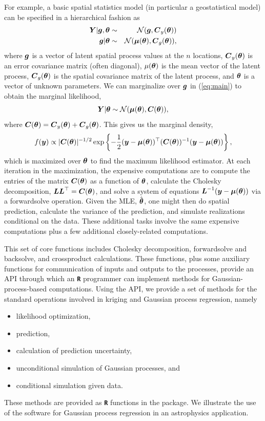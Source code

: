 \documentclass[12pt]{article}
\newcommand{\proglang}[1]{\textbf{\texttt{#1}}}
\newcommand{\bm}[1]{\mbox{\boldmath $#1$}}
\begin{document}
For example, a
basic spatial statistics model (in particular a geostatistical model) can be specified in a hierarchical fashion as
\begin{eqnarray}
\bm{Y}|\bm{g},\bm{\theta} & \sim & \mathcal{N}(\bm{g},\bm{C}_y(\bm{\theta})) \nonumber\\
\bm{g}|\bm{\theta} & \sim & \mathcal{N}(\bm{\mu}(\bm{\theta}),\bm{C}_g(\bm{\theta})),\label{eq:main}
\end{eqnarray}
 where $\bm{g}$ is a vector of latent spatial process values at the $n$ locations, $\bm{C}_y(\bm{\theta})$ is an error covariance matrix (often diagonal), $\mu(\bm{\theta})$ is the mean vector of the latent process, $\bm{C}_g(\bm{\theta})$ is the spatial covariance matrix of the latent process, and $\bm{\theta}$ is a vector of unknown parameters.
We can marginalize over $\bm{g}$ in (\ref{eq:main}) to obtain the marginal likelihood,
\[
\bm{Y}|\bm{\theta} \sim\mathcal{N}(\bm{\mu}(\bm{\theta}), \bm{C}(\bm{\theta})),\]
where $\bm{C}(\bm{\theta}) = \bm{C}_y(\bm{\theta}) + \bm{C}_g(\bm{\theta})$. 
This gives us the marginal density,
\[f(\bm{y})\propto|\bm{C}(\bm{\theta})|^{-1/2}\exp\left\{
  -\frac{1}{2}(\bm{y}-\bm{\mu}(\bm{\theta}))^{\top}(\bm{C}(\bm{\theta}))^{-1}(\bm{y}-\bm{\mu}(\bm{\theta}))\right\}, \]
which is maximized over $\bm{\theta}$ to find the maximum
likelihood estimator. At each iteration 
in the maximization, the expensive computations are to compute the entries of the matrix $\bm{C}(\bm{\theta})$ as a function of $\bm{\theta}$, calculate the Cholesky decomposition,
$\bm{LL}^{\top}=\bm{C}(\bm{\theta})$, and solve a system of
equations $\bm{L}^{-1}(\bm{y}-\bm{\mu}(\bm{\theta}))$ via a forwardsolve operation. Given the MLE, $\hat{\bm{\theta}}$,
one might then do spatial prediction, calculate the variance of the prediction, and simulate
realizations conditional on the data. These additional tasks involve the same expensive computations plus
a few additional closely-related computations.  

  This set of core
functions includes Cholesky decomposition, forwardsolve and backsolve, and crossproduct calculations. These functions, plus some auxiliary functions for communication of inputs
and outputs to the processes, provide an API through which an \proglang{R}
programmer can implement methods for Gaussian-process-based
computations. Using the API, we provide a set of methods for the
standard operations involved in kriging and Gaussian process
regression, namely 
\begin{itemize}
\item likelihood optimization, 
\item prediction,
\item calculation of prediction uncertainty, 
\item unconditional simulation of
Gaussian processes, and 
\item conditional simulation given data.
\end{itemize}
These
methods are provided as \proglang{R} functions in the package. We
illustrate the use of the software for Gaussian process regression in
an astrophysics application.
\end{document}
